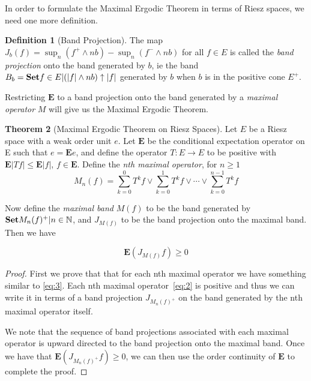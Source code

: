 \documentclass[letterpaper,10pt,oneside,onecolumn,reqno]{amsart}
\newcommand{\NN}{\mathbb N}
\theoremstyle{definition}
\newtheorem{thm}{Theorem}
\newtheorem{defn}[thm]{Definition}
\newcommand{\catname}[1]{{\normalfont\textbf{#1}}}
\newcommand{\Set}{\catname{Set}}
\newcommand{\meet}{\wedge}
\newcommand{\join}{\vee}
\begin{document}
In order to formulate the Maximal Ergodic Theorem in terms of Riesz spaces, we need one more definition. 

\begin{defn}[Band Projection]\label{def:19}
The map $J_b(f) = \sup_n (f^+ \meet nb) - \sup_n(f^- \meet nb)$ for all $f \in E$ is called the \emph{band projection} onto the band generated by $b$, ie the band $B_b = \Set{f \in E | (|f| \meet nb) \uparrow |f|}$ generated by $b$ when $b$ is in the positive cone $E^+$. 
\end{defn}

Restricting $\mathbf{E}$ to a band projection onto the band generated by a \emph{maximal operator} $M$ will give us the Maximal Ergodic Theorem.

\begin{thm}[Maximal Ergodic Theorem on Riesz Spaces]
\label{thr:1}
Let $E$ be a Riesz space with a weak order unit $e$. Let $\mathbf{E}$ be the conditional expectation operator on E such that $e = \mathbf{E}e$, and define the operator $T : E \to E$ to be positive with $\mathbf{E}|Tf| \leq \mathbf{E}|f|$, $f \in \mathbf{E}$. Define the \emph{nth maximal operator}, for $n \geq 1$
\begin{equation}\label{eq:2}
M_n(f) = \sum\limits_{k=0}^{0} T^kf \join \sum\limits_{k=0}^{1} T^kf \join \cdots \join \sum\limits_{k=0}^{n-1} T^kf
\end{equation}

Now define the \emph{maximal band} $M(f)$ to be the band generated by $\Set{M_n(f)^+ | n \in \NN}$, and $J_{M(f)}$ to be the band projection onto the maximal band. Then we have

\begin{equation}\label{eq:3}
\mathbf{E}(J_{M(f)}f) \geq 0
\end{equation}
\end{thm}

\begin{proof}
\label{prf:max-erg}
First we prove that that for each nth maximal operator we have something similar to \eqref{eq:3}. Each nth maximal operator~\eqref{eq:2} is positive and thus we can write it in terms of a band projection $J_{M_n(f)^+}$ on the band generated by the nth maximal operator itself. 

We note that the sequence of band projections associated with each maximal operator is upward directed to the band projection onto the maximal band. Once we have that $\mathbf{E}(J_{M_n(f)^+}f) \geq 0$, we can then use the order continuity of $\mathbf{E}$ to complete the proof. 
\end{proof}

\printindex
\end{document}
